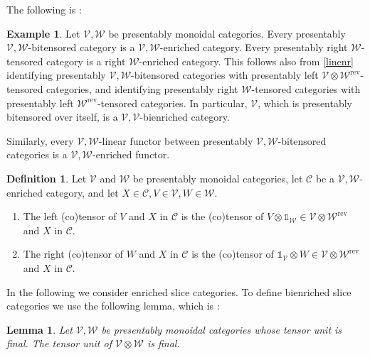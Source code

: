 \documentclass[10pt,oneside]{article}
\numberwithin{equation}{section} %
\numberwithin{figure}{section} %
\theoremstyle{plain}
\newtheorem{lemma}[theorem]{Lemma}
\theoremstyle{definition}
\newtheorem{definition}[theorem]{Definition}
\newtheorem{example}[theorem]{Example}
\newcommand{\mC}{{\mathcal C}}
\newcommand{\mV}{{\mathcal V}}
\newcommand{\mW}{{\mathcal W}}
\newcommand{\rev}{{\mathrm{rev}}}
\newcommand{\ot}{\otimes}
\newcommand{\tu}{{\mathbb 1}}
\begin{document}
The following is \cite[Example 2.134.]{heine2024bienriched}:

\begin{example}
Let $\mV,\mW$ be presentably monoidal categories. Every presentably $\mV,\mW$-bitensored category is a $\mV,\mW$-enriched category.
Every presentably right $\mW$-tensored category is a right $\mW$-enriched category.
This follows also from \cref{linenr} identifying
presentably $\mV,\mW$-bitensored categories with presentably left $\mV \ot \mW^\rev$-tensored categories, and identifying
presentably right $\mW$-tensored categories with presentably left $\mW^\rev$-tensored categories.
In particular, $\mV$, which is presentably bitensored over itself, is a $\mV,\mV$-bienriched category.

Similarly, every $\mV,\mW$-linear functor between presentably $\mV,\mW$-bitensored categories is a $\mV,\mW$-enriched functor.

\end{example}

\begin{definition}Let $\mV$ and $\mW$ be presentably monoidal categories, let $\mC$ be a  
$\mV,\mW$-enriched category, and let $X \in \mC, V \in \mV, W \in \mW.$	 
\begin{enumerate}[\normalfont(1)]\setlength{\itemsep}{-2pt}
\item The left (co)tensor of $V$ and $X$ in $\mC$ is the (co)tensor of
$V \ot \tu_\mW \in \mV \ot \mW^\rev$ and $X$ in $\mC.$

\item The right (co)tensor of $W$ and $X$ in $\mC$ is the (co)tensor of
$\tu_\mV \ot W \in \mV \ot \mW^\rev$ and $X$ in $\mC.$



\end{enumerate}

\end{definition}

In the following we consider enriched slice categories.
To define bienriched slice categories we use the following lemma, which is \cite[Lemma 2.1.23.]{oriented}:

\begin{lemma}\label{tensorunit}
Let $\mV, \mW$ be presentably monoidal categories whose tensor unit is final.
The tensor unit of $\mV \ot \mW$ is final.
	
\end{lemma}

\end{document}
